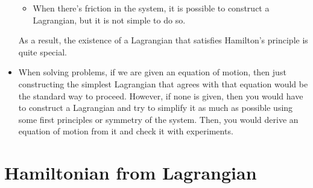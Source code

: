 \documentclass[10pt]{article}
\begin{document}
\begin{itemize}
\begin{itemize}
  		\item When there's friction in the system, it is possible to construct a Lagrangian, but it is not simple to do so.
  	\end{itemize}
  	As a result, the existence of a Lagrangian that satisfies Hamilton's principle is quite special.

  	\item When solving problems, if we are given an equation of motion, then just constructing the simplest Lagrangian that agrees with that equation would be the standard way to proceed. However, if none is given, then you would have to construct a Lagrangian and try to simplify it as much as possible using some first principles or symmetry of the system. Then, you would derive an equation of motion from it and check it with experiments.
  \end{itemize}

  \section{Hamiltonian from Lagrangian}
\end{document}
